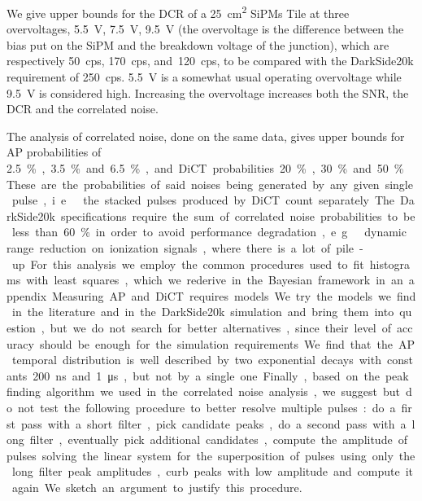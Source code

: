 \documentclass[11pt]{article}
\begin{document}
    We give upper bounds for the DCR of a \SI{25}{cm^2} SiPMs Tile at three
    overvoltages, \SI{5.5}{V}, \SI{7.5}{V}, \SI{9.5}{V} (the overvoltage is the
    difference between the bias put on the SiPM and the breakdown voltage of
    the junction), which are respectively \SI{50}{cps}, \SI{170}{cps},
    and~\SI{120}{cps}, to be compared with the DarkSide20k requirement of
    \SI{250}{cps}. \SI{5.5}{V} is a somewhat usual operating overvoltage while
    \SI{9.5}{V} is considered high. Increasing the overvoltage increases both
    the SNR, the DCR and the correlated noise.
    
    The analysis of correlated noise, done on the same data, gives upper bounds
    for AP probabilities of \SI{2.5}\%, \SI{3.5}\% and \SI{6.5}\%, and DiCT
    probabilities \SI{20}\%, \SI{30}\% and~\SI{50}\%. These are the
    probabilities of said noises being generated by any given single pulse,
    i.e.\ the stacked pulses produced by DiCT count separately. The DarkSide20k
    specifications require the sum of correlated noise probabilities to be less
    than \SI{60}\% in order to avoid performance degradation, e.g.\ dynamic
    range reduction on ionization signals, where there is a lot of pile-up. For
    this analysis we employ the common procedures used to fit histograms with
    least squares, which we rederive in the Bayesian framework in an appendix.
    
    Measuring AP and DiCT requires models. We try the models we find in the
    literature and in the DarkSide20k simulation and bring them into question,
    but we do not search for better alternatives, since their level of accuracy
    should be enough for the simulation requirements. We find that the AP
    temporal distribution is well described by two exponential decays with
    constants \SI{200}{ns} and \SI{1}{\micro s}, but not by a single one.
    
    Finally, based on the peak finding algorithm we used in the correlated
    noise analysis, we suggest but do not test the following procedure to
    better resolve multiple pulses: do a first pass with a short filter, pick
    candidate peaks, do a second pass with a long filter, eventually pick
    additional candidates, compute the amplitude of pulses solving the linear
    system for the superposition of pulses using only the long filter peak
    amplitudes, curb peaks with low amplitude and compute it again. We sketch
    an argument to justify this procedure.
\end{document}
